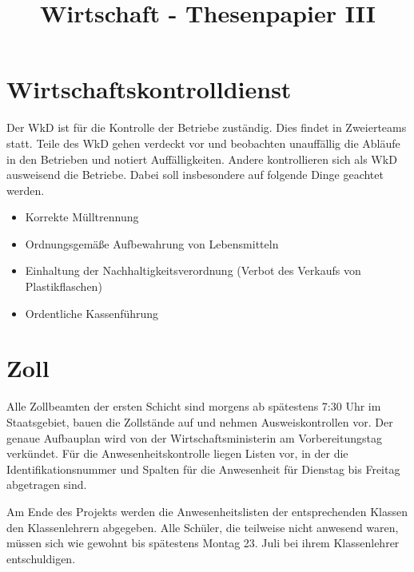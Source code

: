 \documentclass{sasbase}
\begin{document}
\onecolumn
\title{Wirtschaft - Thesenpapier III}

\mytitle

\setlength{\parindent}{0mm}
\setlength{\parskip}{2mm}

\section{Wirtschaftskontrolldienst}

Der WkD ist für die Kontrolle der Betriebe zuständig. Dies findet in Zweierteams statt. Teile
des WkD gehen verdeckt vor und beobachten unauffällig die Abläufe in den Betrieben und notiert
Auffälligkeiten. Andere kontrollieren sich als WkD ausweisend die Betriebe. Dabei soll
insbesondere auf folgende Dinge geachtet werden.

\begin{itemize}
    \item Korrekte Mülltrennung
    \item Ordnungsgemäße Aufbewahrung von Lebensmitteln
    \item Einhaltung der Nachhaltigkeitsverordnung (Verbot des Verkaufs von Plastikflaschen)
    \item Ordentliche Kassenführung
\end{itemize}

\section{Zoll}

Alle Zollbeamten der ersten Schicht sind morgens ab spätestens 7:30 Uhr im Staatsgebiet,
bauen die Zollstände auf und nehmen Ausweiskontrollen vor. Der genaue Aufbauplan wird von der
Wirtschaftsministerin am Vorbereitungstag verkündet. Für die Anwesenheitskontrolle liegen Listen
vor, in der die Identifikationsnummer und Spalten für die Anwesenheit für Dienstag bis Freitag
abgetragen sind.

Am Ende des Projekts werden die Anwesenheitslisten der entsprechenden Klassen den Klassenlehrern
abgegeben. Alle Schüler, die teilweise nicht anwesend waren, müssen sich wie gewohnt bis spätestens
Montag 23. Juli bei ihrem Klassenlehrer entschuldigen.
\end{document}

